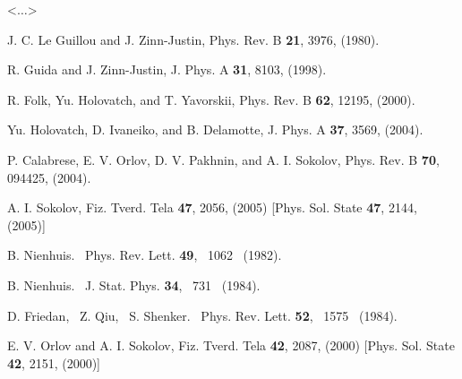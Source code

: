 \documentclass[aps,prb,preprint,showpacs,preprintnumbers,amsmath,amssymb]{revtex4}
\newcommand{\comment}[1]{} %
\begin{document}
<$\dots$>
\comment{
\section{Conclusion}

To summarize, we have calculated pseudo-$\epsilon$ expansions for dimensionless
effective coupling constant $g^*$ and critical exponents of 2D Euclidean $n$-vector
field theory up to $\tau^5$ order. Numerical estimates of critical exponents for
models with $n = 1, 0, -1$ exactly solvable at criticality have been found using
Pad\'e and Pad\'e-Borel resummation techniques as well as by direct summation with
optimal cut off. Comparison of the results obtained with each others and with their
exact counterparts has shown that direct summation of pseudo-$\epsilon$ expansions
provides, in general, numerical estimates that are no worse than those given by
resummation approaches mentioned. This implies that the pseudo-$\epsilon$ expansion
approach may be thought of as some specific resummation technique.
}

\begin{thebibliography}{999}

 J. C. Le Guillou and J. Zinn-Justin, Phys. Rev. B \textbf{21}, 3976, (1980).

 R. Guida and J. Zinn-Justin, J. Phys. A \textbf{31}, 8103, (1998).

 R. Folk, Yu. Holovatch, and T. Yavorskii, Phys. Rev. B \textbf{62}, 12195, (2000).

 Yu. Holovatch, D. Ivaneiko, and B. Delamotte, J. Phys. A \textbf{37}, 3569, (2004).

 P. Calabrese, E. V. Orlov, D. V. Pakhnin, and A. I. Sokolov, Phys. Rev. B
\textbf{70}, 094425, (2004).

 A. I. Sokolov, Fiz. Tverd. Tela \textbf{47}, 2056, (2005) [Phys. Sol. State
\textbf{47}, 2144, (2005)]

 B. Nienhuis. ~Phys. Rev. Lett. \textbf{49}, ~1062 ~(1982).

 B. Nienhuis. ~J. Stat. Phys. \textbf{34}, ~731 ~(1984).

 D. Friedan, ~Z. Qiu, ~S. Shenker. ~Phys. Rev. Lett. \textbf{52}, ~1575 ~(1984).

 E. V. Orlov and A. I. Sokolov, Fiz. Tverd. Tela \textbf{42}, 2087, (2000)
[Phys. Sol. State \textbf{42}, 2151, (2000)]

\end{thebibliography}
\end{document}
